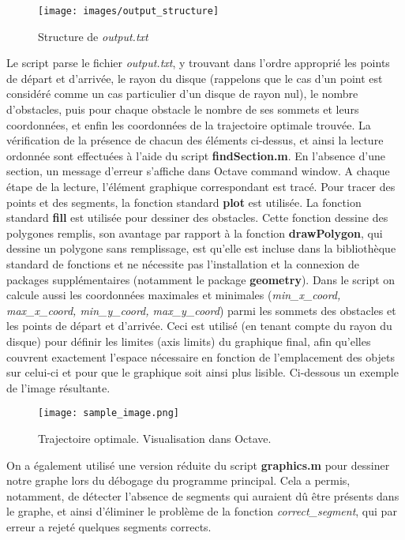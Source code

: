 \documentclass[12pt]{article}
\begin{document}
	\begin{figure}[H]
		\centering
		\texttt{[image: images/output\_structure]}
		\caption{Structure de \textit{output.txt}}
		\label{fig:output_structure}
	\end{figure}
	Le script parse le fichier \textit{output.txt}, y trouvant dans l'ordre approprié les points de départ et d'arrivée, le rayon du disque (rappelons que le cas d'un point est considéré comme un cas particulier d'un disque de rayon nul), le nombre d'obstacles, puis pour chaque obstacle le nombre de ses sommets et leurs coordonnées, et enfin les coordonnées de la trajectoire optimale trouvée. La vérification de la présence de chacun des éléments ci-dessus, et ainsi la lecture ordonnée sont effectuées à l'aide du script \textbf{findSection.m}. En l'absence d’une section, un message d'erreur s'affiche dans Octave command window. A chaque étape de la lecture, l'élément graphique correspondant est tracé. Pour tracer des points et des segments, la fonction standard \textbf{plot} est utilisée. La fonction standard \textbf{fill} est utilisée pour dessiner des obstacles. Cette fonction dessine des polygones remplis, son avantage par rapport à la fonction \textbf{drawPolygon}, qui dessine un polygone sans remplissage, est qu'elle est incluse dans la bibliothèque standard de fonctions et ne nécessite pas l'installation et la connexion de packages supplémentaires (notamment le package \textbf{geometry}). Dans le script on calcule aussi les coordonnées maximales et minimales (\textit{min\_x\_coord, max\_x\_coord, min\_y\_coord, max\_y\_coord}) parmi les sommets des obstacles et les points de départ et d'arrivée. Ceci est utilisé (en tenant compte du rayon du disque) pour définir les limites (axis limits) du graphique final, afin qu'elles couvrent exactement l'espace nécessaire en fonction de l'emplacement des objets sur celui-ci et pour que le graphique soit ainsi plus lisible. Ci-dessous un exemple de l'image résultante. 
		\begin{figure}[H]
	\centering
	\texttt{[image: sample\_image.png]}
	\caption{Trajectoire optimale. Visualisation dans Octave.}
	\label{sample_image}
	\end{figure}
	
	On a également utilisé une version réduite du script \textbf{graphics.m} pour dessiner notre graphe lors du débogage du programme principal. Cela a permis, notamment, de détecter l'absence de segments qui auraient dû être présents dans le graphe, et ainsi d'éliminer le problème de la fonction \textit{correct\_segment}, qui par erreur a rejeté quelques segments corrects.
\end{document}
